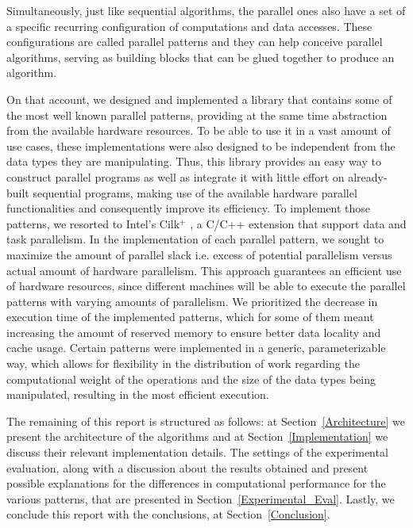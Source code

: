 \documentclass[conference,compsoc]{IEEEtran}
\begin{document}
Simultaneously, just like sequential algorithms, the parallel ones also have a set of a specific recurring configuration of computations and data accesses. These configurations are called parallel patterns \cite{mccool2010structured} and they can help conceive parallel algorithms, serving as building blocks that can be glued together to produce an algorithm.%

On that account, we designed and implemented a library that contains some of the most well known parallel patterns, providing at the same time abstraction from the available hardware resources. To be able to use it in a vast amount of use cases, these implementations were also designed to be independent from the data types they are manipulating.
Thus, this library provides an easy way to construct parallel programs as well as integrate it with little effort on already-built sequential programs, making use of the available hardware parallel functionalities and consequently improve its efficiency.
To implement those patterns, we resorted to Intel's Cilk$^+$ \cite{robison2012cilk}, a C/C++ extension that support data and task parallelism.
In the implementation of each parallel pattern, we sought to maximize the amount of parallel slack i.e. excess of potential parallelism versus actual amount of hardware parallelism. This approach guarantees an efficient use of hardware resources, since different machines will be able to execute the parallel patterns with varying amounts of parallelism. We prioritized the decrease in execution time of the implemented patterns, which for some of them meant increasing the amount of reserved memory to ensure better data locality and cache usage. Certain patterns were implemented in a generic, parameterizable way, which allows for flexibility in the distribution of work regarding the computational weight of the operations and the size of the data types being manipulated, resulting in the most efficient execution.

The remaining of this report is structured as follows: at Section~\ref{Architecture} we present the architecture of the algorithms and at Section~\ref{Implementation} we discuss their relevant implementation details. The settings of the experimental evaluation, along with a discussion about the results obtained and present possible explanations for the differences in computational performance for the various patterns, that are presented in Section~\ref{Experimental_Eval}. Lastly, we conclude this report with the conclusions, at Section~\ref{Conclusion}.
\end{document}
